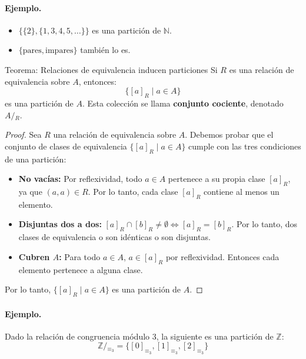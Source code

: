 \paragraph{Ejemplo.}
\begin{itemize}
  \item $\{ \{2\}, \{1,3,4,5,\ldots\} \}$ es una partición de $\mathbb{N}$.
  \item $\{ \text{pares}, \text{impares} \}$ también lo es.
\end{itemize}

\begin{thmblock}{Teorema: Relaciones de equivalencia inducen particiones}
Si $R$ es una relación de equivalencia sobre $A$, entonces:
\[
\{ [a]_R \mid a \in A \}
\]
es una partición de $A$. Esta colección se llama \textbf{conjunto cociente}, denotado $A/\!_R$.
\end{thmblock}

\begin{proof}
Sea $R$ una relación de equivalencia sobre $A$. Debemos probar que el conjunto de clases de equivalencia $\{ [a]_R \mid a \in A \}$ cumple con las tres condiciones de una partición:
\begin{itemize}
  \item \textbf{No vacías:} Por reflexividad, todo $a \in A$ pertenece a su propia clase $[a]_R$, ya que $(a,a) \in R$. Por lo tanto, cada clase $[a]_R$ contiene al menos un elemento.
  \item \textbf{Disjuntas dos a dos:} $[a]_R \cap [b]_R \neq \emptyset \Leftrightarrow [a]_R = [b]_R $. Por lo tanto, dos clases de equivalencia o son idénticas o son disjuntas.
  \item \textbf{Cubren $A$:} Para todo $a \in A$, $a \in [a]_R$ por reflexividad. Entonces cada elemento pertenece a alguna clase.
\end{itemize}
Por lo tanto, $\{ [a]_R \mid a \in A \}$ es una partición de $A$.
\end{proof}

\paragraph{Ejemplo.} Dado la relación de congruencia módulo 3, la siguiente es una partición de $\mathbb{Z}$:
\[
\mathbb{Z}/\!_{\equiv_3} = \{ [0]_{\equiv_3}, [1]_{\equiv_3}, [2]_{\equiv_3} \}
\]


